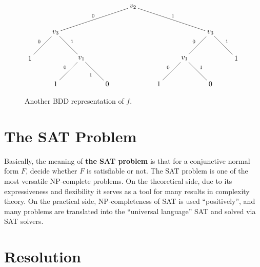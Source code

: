 \documentclass[12pt]{book}
\begin{document}
\begin{examp}
\begin{figure}[h]
  \centering
  \begin{displaymath}
    \xygraph{
      []{v_2} ( 
        - [dlll]{v_3}_0 (
          - [dl]{1}_0 (),
          - [dr]{v_1}^1 (
            - [dl]{1}_0 (),
            - [dr]{0}_1 ()
          )
        ),
        - [drrr]{v_3}^1 (
          - [dl]{v_1}_0 (
            - [dl]{1}_0 (),
            - [dr]{0}^1 ()
          ),
          -[dr]{1}^1 ()
          )
        )
      }
  \end{displaymath}
  \caption{Another BDD representation of $f$.}
  \label{fig:BooleanFunctionDTExampDT2}
\end{figure}
\end{examp}


\section{The SAT Problem}
\label{sec:The SAT Problem}

\begin{defi}\label{def:sat} Basically, the meaning of \textbf{the SAT problem} is that for a conjunctive normal form $F$, decide whether $F$ is satisfiable or not.
The SAT problem is one of the most versatile NP-complete problems. On the theoretical side, due to its expressiveness and flexibility it 
serves as a tool for many results in complexity theory. On the practical side, NP-completeness of SAT is used “positively”, and many problems 
are translated into  the “universal language” SAT and solved via SAT solvers. 
\end{defi}
\section{Resolution}
\label{sec:Resolution}
\end{document}

